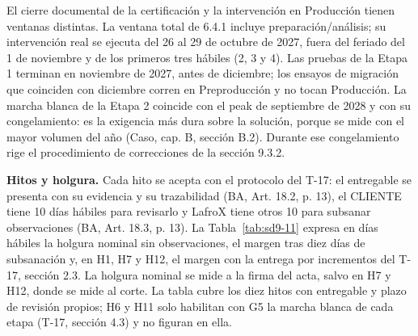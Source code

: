 El cierre documental de la certificación y la intervención en Producción tienen ventanas distintas. La ventana total de 6.4.1 incluye preparación/análisis; su intervención real se ejecuta del 26 al 29 de octubre de 2027, fuera del feriado del 1 de noviembre y de los primeros tres hábiles (2, 3 y 4). Las pruebas de la Etapa 1 terminan en noviembre de 2027, antes de diciembre; los ensayos de migración que coinciden con diciembre corren en Preproducción y no tocan Producción. La marcha blanca de la Etapa 2 coincide con el peak de septiembre de 2028 y con su congelamiento: es la exigencia más dura sobre la solución, porque se mide con el mayor volumen del año (Caso, cap. B, sección B.2). Durante ese congelamiento rige el procedimiento de correcciones de la sección 9.3.2.

\textbf{Hitos y holgura.} Cada hito se acepta con el protocolo del T-17: el entregable se presenta con su evidencia y su trazabilidad (BA, Art. 18.2, p. 13), el CLIENTE tiene 10 días hábiles para revisarlo y LafroX tiene otros 10 para subsanar observaciones (BA, Art. 18.3, p. 13). La Tabla~\ref{tab:sd9-11} expresa en días hábiles la holgura nominal sin observaciones, el margen tras diez días de subsanación y, en H1, H7 y H12, el margen con la entrega por incrementos del T-17, sección 2.3. La holgura nominal se mide a la firma del acta, salvo en H7 y H12, donde se mide al corte. La tabla cubre los diez hitos con entregable y plazo de revisión propios; H6 y H11 solo habilitan con G5 la marcha blanca de cada etapa (T-17, sección 4.3) y no figuran en ella.

